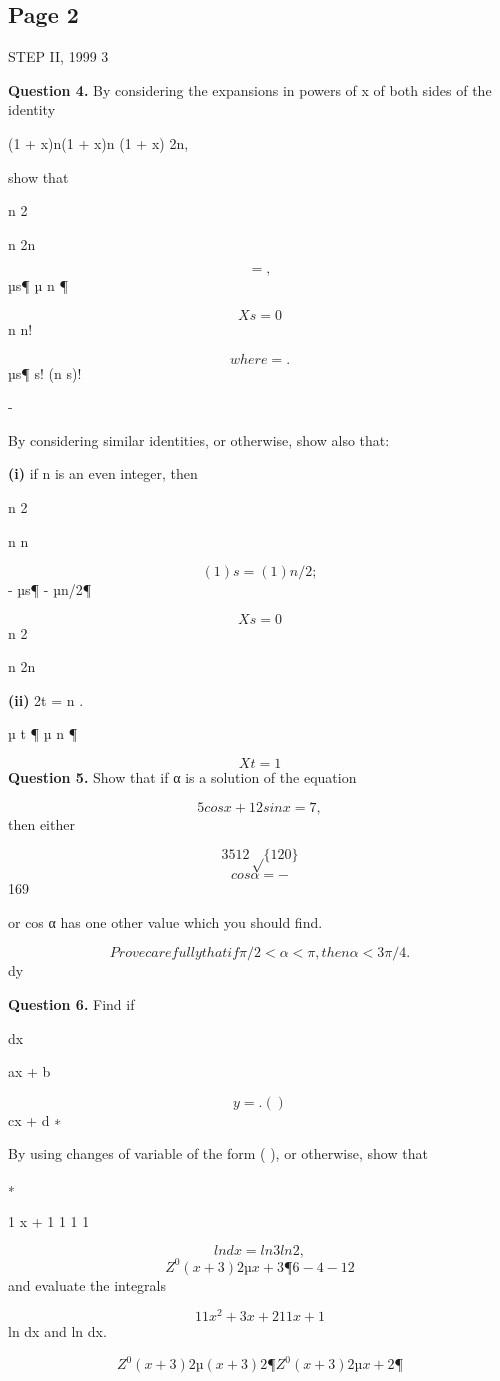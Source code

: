 \documentclass[12pt]{article}
\begin{document}
\subsection*{Page 2}
\begin{flushleft}
STEP II, 1999 3\par
\bigskip\textbf{Question 4.} By considering the expansions in powers of x of both sides of the identity\par
(1 + x)n(1 + x)n (1 + x) 2n,\par
\equiv\par
show that\par
n 2\par
n 2n\par
\[= ,\]
µs¶ µ n ¶\par
\[Xs=0\]
n n!\par
\[where = .\]
µs¶ s! (n s)!\par
-\par
By considering similar identities, or otherwise, show also that:\par
\textbf{(i)} if n is an even integer, then\par
n 2\par
n n\par
\[( 1)s = ( 1)n/2 ;\]
- µs¶ - µn/2¶\par
\[Xs=0\]
n 2\par
n 2n\par
\textbf{(ii)} 2t = n .\par
µ t ¶ µ n ¶\par
\[Xt=1\]
\bigskip\textbf{Question 5.} Show that if α is a solution of the equation\par
\[5cos x + 12sin x = 7,\]
then either\par
\[35 12\sqrt\{120\}\]
\[cosα = -\]
169\par
or cos α has one other value which you should find.\par
\[Prove carefully that if \pi/2 < α < \pi, then α < 3\pi/4.\]
dy\par
\bigskip\textbf{Question 6.} Find if\par
dx\par
ax + b\par
\[y = . ( )\]
cx + d ∗\par
By using changes of variable of the form ( ), or otherwise, show that\par
∗\par
1 x + 1 1 1 1\par
\[ln dx = ln 3 ln 2 ,\]
\[Z^0 (x + 3)2 µ x + 3 ¶ 6 - 4 - 12\]
and evaluate the integrals\par
\[1 1 x^2 + 3x + 2 1 1 x + 1\]
ln dx and ln dx.\par
\[Z^0 (x + 3)2 µ (x + 3)2 ¶ Z^0 (x + 3)2 µ x + 2 ¶\]
\end{flushleft}
\end{document}
